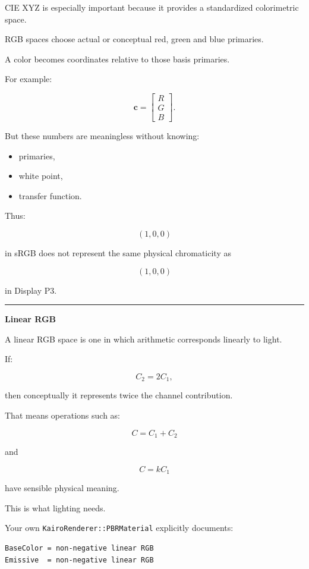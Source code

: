 CIE XYZ is especially important because it provides a standardized colorimetric space.

RGB spaces choose actual or conceptual red, green and blue primaries.

A color becomes coordinates relative to those basis primaries.

For example:

\[
\mathbf c=
\begin{bmatrix}
R\\G\\B
\end{bmatrix}.
\]

But these numbers are meaningless without knowing:

\begin{itemize}
\tightlist
\item
  primaries,
\item
  white point,
\item
  transfer function.
\end{itemize}

Thus:

\[
(1,0,0)
\]

in sRGB does not represent the same physical chromaticity as

\[
(1,0,0)
\]

in Display P3.

\begin{center}\rule{0.5\linewidth}{0.5pt}\end{center}

\textbf{Linear RGB}

A linear RGB space is one in which arithmetic corresponds linearly to light.

If:

\[
C_2=2C_1,
\]

then conceptually it represents twice the channel contribution.

That means operations such as:

\[
C=C_1+C_2
\]

and

\[
C=kC_1
\]

have sensible physical meaning.

This is what lighting needs.

Your own \texttt{KairoRenderer::PBRMaterial} explicitly documents:

\begin{verbatim}
BaseColor = non-negative linear RGB
Emissive  = non-negative linear RGB
\end{verbatim}

